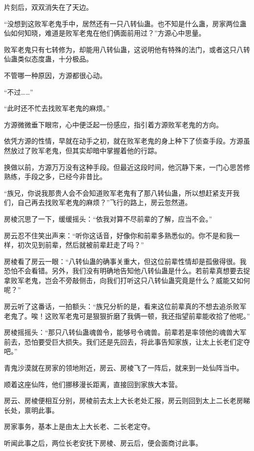 \begin{this_body}
片刻后，双双消失在了天边。

“没想到这败军老鬼手中，居然还有一只八转仙蛊。也不知是什么蛊，房家两位蛊仙如何知晓，难道是败军老鬼在他们俩面前用过？”方源心中思量。

败军老鬼只有七转修为，却能用八转仙蛊，这说明他有特殊的法门，或者这只八转仙蛊类似态度蛊，十分极品。

不管哪一种原因，方源都很心动。

“不过……”

“此时还不忙去找败军老鬼的麻烦。”

方源微微垂下眼帘，心中便泛起一份感应，指引着方源败军老鬼的方向。

依凭方源的性情，早就在动手之初，就在败军老鬼的身上种下了侦查手段。方源虽然放过了败军老鬼，但其实却暗中掌握着他的行踪。

换做以前，方源万万没有这种手段。但最近这段时间，他沉静下来，一门心思苦修熟练，手段之多，已经今非昔比。

“族兄，你说我那贵人会不会知道败军老鬼有了那八转仙蛊，所以想赶紧支开我们，自己再去找败军老鬼的麻烦？”飞行的路上，房云忽然道。

房棱沉思了一下，缓缓摇头：“依我对算不尽前辈的了解，应当不会。”

房云忍不住笑出声来：“听你这话音，好像你和前辈多熟悉似的。你不是和我一样，初次见到前辈，然后就被前辈赶走了吗？”

房棱看了房云一眼：“八转仙蛊的确事关重大，但这位前辈性情却是孤傲得很。我恐怕不会看错。另外，我们没有明确地告知他八转仙蛊是什么。若前辈真想要去捉拿败军老鬼，岂会不旁敲侧击，向我们打听这只八转仙蛊究竟是什么？威能又如何呢？”

房云听了这番话，一拍额头：“族兄分析的是，看来这位前辈真的不想去追杀败军老鬼了。唉！这败军老鬼可是狠狠折磨了我俩一顿，我还指望前辈能收拾了他呢。”

房棱摇摇头：“那只八转仙蛊魂兽令，能够号令魂兽。前辈若是率领他的魂兽大军前去，恐怕要受巨大损失。我们还是先回去，将此事告知家族，让太上长老们定夺吧。”

青鬼沙漠就在房家的领地附近，房云、房棱飞了一阵后，就来到一处仙阵当中。

顺着这座仙阵，他们挪移漫长距离，直接回到家族大本营。

房云、房棱便相互分别，房棱前去太上大长老处汇报，房云则回到太上二长老房睇长处，禀明此事。

房家事务，基本上是由太上大长老、二长老定夺。

听闻此事之后，两位长老安抚下房棱、房云后，便会面商讨此事。


\end{this_body}
